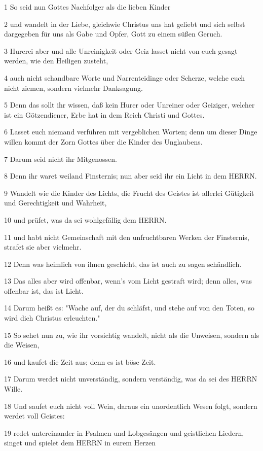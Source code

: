 \par 1 So seid nun Gottes Nachfolger als die lieben Kinder
\par 2 und wandelt in der Liebe, gleichwie Christus uns hat geliebt und sich selbst dargegeben für uns als Gabe und Opfer, Gott zu einem süßen Geruch.
\par 3 Hurerei aber und alle Unreinigkeit oder Geiz lasset nicht von euch gesagt werden, wie den Heiligen zusteht,
\par 4 auch nicht schandbare Worte und Narrenteidinge oder Scherze, welche euch nicht ziemen, sondern vielmehr Danksagung.
\par 5 Denn das sollt ihr wissen, daß kein Hurer oder Unreiner oder Geiziger, welcher ist ein Götzendiener, Erbe hat in dem Reich Christi und Gottes.
\par 6 Lasset euch niemand verführen mit vergeblichen Worten; denn um dieser Dinge willen kommt der Zorn Gottes über die Kinder des Unglaubens.
\par 7 Darum seid nicht ihr Mitgenossen.
\par 8 Denn ihr waret weiland Finsternis; nun aber seid ihr ein Licht in dem HERRN.
\par 9 Wandelt wie die Kinder des Lichts, die Frucht des Geistes ist allerlei Gütigkeit und Gerechtigkeit und Wahrheit,
\par 10 und prüfet, was da sei wohlgefällig dem HERRN.
\par 11 und habt nicht Gemeinschaft mit den unfruchtbaren Werken der Finsternis, strafet sie aber vielmehr.
\par 12 Denn was heimlich von ihnen geschieht, das ist auch zu sagen schändlich.
\par 13 Das alles aber wird offenbar, wenn's vom Licht gestraft wird; denn alles, was offenbar ist, das ist Licht.
\par 14 Darum heißt es: "Wache auf, der du schläfst, und stehe auf von den Toten, so wird dich Christus erleuchten."
\par 15 So sehet nun zu, wie ihr vorsichtig wandelt, nicht als die Unweisen, sondern als die Weisen,
\par 16 und kaufet die Zeit aus; denn es ist böse Zeit.
\par 17 Darum werdet nicht unverständig, sondern verständig, was da sei des HERRN Wille.
\par 18 Und saufet euch nicht voll Wein, daraus ein unordentlich Wesen folgt, sondern werdet voll Geistes:
\par 19 redet untereinander in Psalmen und Lobgesängen und geistlichen Liedern, singet und spielet dem HERRN in eurem Herzen
